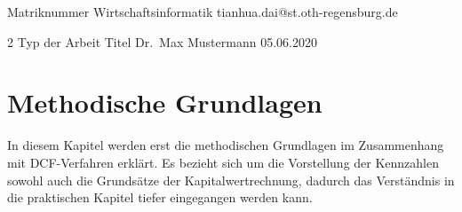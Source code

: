 \documentclass[12pt,a4paper,bibliography=totocnumbered,listof=totocnumbered]{article}
\begin{document}
\newcommand{\studierenderName}{Tianhua Dai}
\student{\studierenderName}		%
{Matriknummer}						%
{Wirtschaftsinformatik}			%
{tianhua.dai@st.oth-regensburg.de}	%

{2}								%
{Typ der Arbeit}				%
{Titel}				%
{Dr.\ Max Mustermann}		%
{05.06.2020}				%
\pagebreak


\setcounter{tocdepth}{2}
\tableofcontents
\pagebreak


\renewcommand{\sectionmark}[1]{\markright{#1}}
\renewcommand{\subsectionmark}[1]{}
\renewcommand{\subsubsectionmark}[1]{}
\rhead{\rightmark}

{}
\renewcommand{\thesection}{\arabic{section}}
\renewcommand{\theHsection}{\arabic{section}}
\setcounter{section}{0}
\setcounter{page}{1}

\section{Methodische Grundlagen}
In diesem Kapitel werden erst die methodischen Grundlagen im Zusammenhang mit DCF-Verfahren erklärt. 
Es bezieht sich um die Vorstellung der Kennzahlen sowohl auch die Grundsätze der Kapitalwertrechnung, dadurch das Verständnis in die praktischen Kapitel tiefer eingegangen werden kann.
\end{document}
